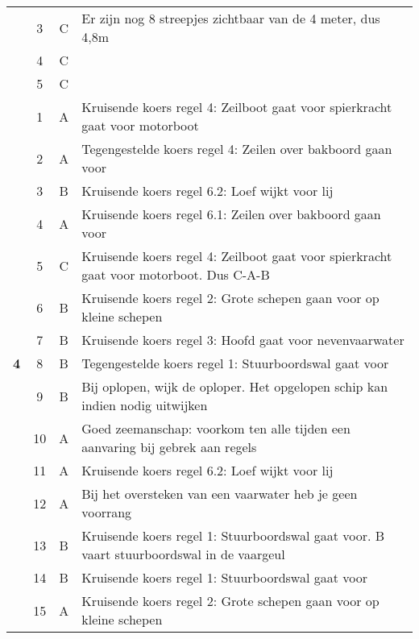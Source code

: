 \begin{table}[h!]
\begin{tabular}{c|c|c|m{9.5cm}}
		& 3 & C &  Er zijn nog 8 streepjes zichtbaar van de 4 meter, dus 4,8m\\ \cline{2-4} 
		& 4 & C &  \\ \cline{2-4}
		& 5 & C &  \\ \cline{2-4} \hline
		\multirow{20}{*}{\sffamily\bfseries{\textcolor{ocre}{\LARGE4}} } 
		& 1 & A & Kruisende koers regel 4: Zeilboot gaat voor spierkracht gaat voor motorboot\\ \cline{2-4} 
		& 2 & A & Tegengestelde koers regel 4: Zeilen over bakboord gaan voor \\ \cline{2-4} 
		& 3 & B & Kruisende koers regel 6.2: Loef wijkt voor lij \\ \cline{2-4} 
		& 4 & A & Kruisende koers regel 6.1: Zeilen over bakboord gaan voor \\ \cline{2-4} 
		& 5 & C & Kruisende koers regel 4: Zeilboot gaat voor spierkracht gaat voor motorboot. Dus C-A-B \\ \cline{2-4} 
		& 6 & B & Kruisende koers regel 2: Grote schepen gaan voor op kleine schepen \\ \cline{2-4} 
		& 7 & B & Kruisende koers regel 3: Hoofd gaat voor nevenvaarwater \\ \cline{2-4} 
		& 8 & B & Tegengestelde koers regel 1: Stuurboordswal gaat voor \\ \cline{2-4} 
		& 9 & B & Bij oplopen, wijk de oploper. Het opgelopen schip kan indien nodig uitwijken\\ \cline{2-4} 
		& 10 & A & Goed zeemanschap: voorkom ten alle tijden een aanvaring bij gebrek aan regels \\ \cline{2-4} 
		& 11 & A & Kruisende koers regel 6.2: Loef wijkt voor lij \\ \cline{2-4} 
		& 12 & A & Bij het oversteken van een vaarwater heb je geen voorrang \\ \cline{2-4} 
		& 13 & B & Kruisende koers regel 1: Stuurboordswal gaat voor. B vaart stuurboordswal in de vaargeul\\ \cline{2-4} 
		& 14 & B & Kruisende koers regel 1: Stuurboordswal gaat voor \\ \cline{2-4} 
   		& 15 & A & Kruisende koers regel 2: Grote schepen gaan voor op kleine schepen \\ 
	\end{tabular}
\end{table}

